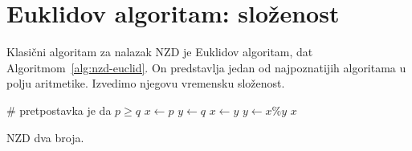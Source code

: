 \section{Euklidov algoritam: složenost}
Klasični algoritam za nalazak NZD je Euklidov algoritam, dat Algoritmom~\ref{alg:nzd-euclid}. On predstavlja jedan od najpoznatijih algoritama u polju aritmetike. Izvedimo njegovu vremensku složenost. 

\begin{algorithm}
	\begin{algorithmic}[1]
		  \# pretpostavka je da $p \geq  q$
		\State $x \gets p$ 
		\State $y \gets q$
		\State $ x \gets y  $
		\State $y \gets x \% y $
		\EndWhile
		\State \Return $x$
		\EndProcedure
	\end{algorithmic}   \caption{NZD dva broja.} \label{alg:nzd-euclid}
\end{algorithm}

